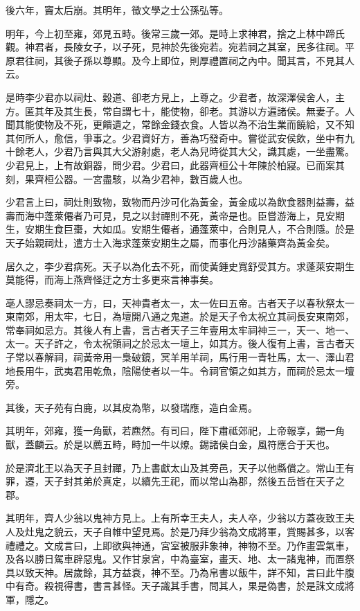 後六年，竇太后崩。其明年，徵文學之士公孫弘等。

明年，今上初至雍，郊見五畤。後常三歲一郊。是時上求神君，捨之上林中蹄氏觀。神君者，長陵女子，以子死，見神於先後宛若。宛若祠之其室，民多往祠。平原君往祠，其後子孫以尊顯。及今上即位，則厚禮置祠之內中。聞其言，不見其人云。

是時李少君亦以祠灶、穀道、卻老方見上，上尊之。少君者，故深澤侯舍人，主方。匿其年及其生長，常自謂七十，能使物，卻老。其游以方遍諸侯。無妻子。人聞其能使物及不死，更饋遺之，常餘金錢衣食。人皆以為不治生業而饒給，又不知其何所人，愈信，爭事之。少君資好方，善為巧發奇中。嘗從武安侯飲，坐中有九十餘老人，少君乃言與其大父游射處，老人為兒時從其大父，識其處，一坐盡驚。少君見上，上有故銅器，問少君。少君曰，此器齊桓公十年陳於柏寢。已而案其刻，果齊桓公器。一宮盡駭，以為少君神，數百歲人也。

少君言上曰，祠灶則致物，致物而丹沙可化為黃金，黃金成以為飲食器則益壽，益壽而海中蓬萊僊者乃可見，見之以封禪則不死，黃帝是也。臣嘗游海上，見安期生，安期生食巨棗，大如瓜。安期生僊者，通蓬萊中，合則見人，不合則隱。於是天子始親祠灶，遣方士入海求蓬萊安期生之屬，而事化丹沙諸藥齊為黃金矣。

居久之，李少君病死。天子以為化去不死，而使黃錘史寬舒受其方。求蓬萊安期生莫能得，而海上燕齊怪迂之方士多更來言神事矣。

亳人謬忌奏祠太一方，曰，天神貴者太一，太一佐曰五帝。古者天子以春秋祭太一東南郊，用太牢，七日，為壇開八通之鬼道。於是天子令太祝立其祠長安東南郊，常奉祠如忌方。其後人有上書，言古者天子三年壹用太牢祠神三一，天一、地一、太一。天子許之，令太祝領祠之於忌太一壇上，如其方。後人復有上書，言古者天子常以春解祠，祠黃帝用一梟破鏡，冥羊用羊祠，馬行用一青牡馬，太一、澤山君地長用牛，武夷君用乾魚，陰陽使者以一牛。令祠官領之如其方，而祠於忌太一壇旁。

其後，天子苑有白鹿，以其皮為幣，以發瑞應，造白金焉。

其明年，郊雍，獲一角獸，若麃然。有司曰，陛下肅祗郊祀，上帝報享，錫一角獸，蓋麟云。於是以薦五畤，畤加一牛以燎。錫諸侯白金，風符應合于天也。

於是濟北王以為天子且封禪，乃上書獻太山及其旁邑，天子以他縣償之。常山王有罪，遷，天子封其弟於真定，以續先王祀，而以常山為郡，然後五岳皆在天子之郡。

其明年，齊人少翁以鬼神方見上。上有所幸王夫人，夫人卒，少翁以方蓋夜致王夫人及灶鬼之貌云，天子自帷中望見焉。於是乃拜少翁為文成將軍，賞賜甚多，以客禮禮之。文成言曰，上即欲與神通，宮室被服非象神，神物不至。乃作畫雲氣車，及各以勝日駕車辟惡鬼。又作甘泉宮，中為臺室，畫天、地、太一諸鬼神，而置祭具以致天神。居歲餘，其方益衰，神不至。乃為帛書以飯牛，詳不知，言曰此牛腹中有奇。殺視得書，書言甚怪。天子識其手書，問其人，果是偽書，於是誅文成將軍，隱之。

